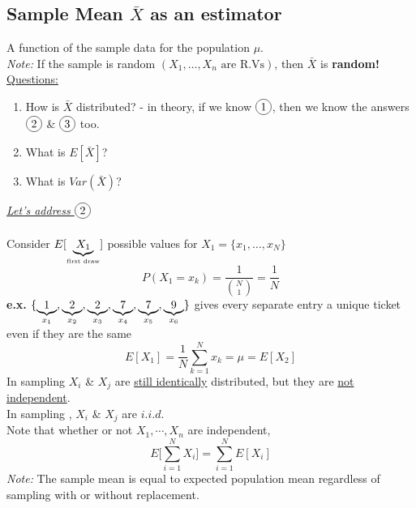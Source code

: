 \subsection*{Sample Mean $\bar{X}$ as an estimator}
A function of the sample data for the population $\mu$.\\
\emph{Note: } If the sample is random $(X_1, \ldots, X_n \text{ are R.Vs})$, then $\bar{X}$ is \textbf{random!}\\
\underline{Questions:} 
\begin{enumerate}[label=\protect\circled{\arabic*}]
	\item How is $\bar{X}$ distributed? - in theory, if we know $\circled{1}$, then we know the answers $\circled{2}$ \& $\circled{3}$ too.
	\item What is $E[\bar{X}]$?
	\item What is $Var(\bar{X})$?
\end{enumerate}
\underline{\textit{Let's address $\circled{2}$}}\\\\
\qquad Consider $E[\underbrace{X_1}_{\text{\tiny first draw}}]$ \qquad \qquad \hspace{5em} possible values for $X_1 = \{x_1, \ldots, x_N\}$
\begin{equation*}
	P(X_1 = x_k) = \frac{1}{\binom{N}{1}} = \frac{1}{N}
\end{equation*}
\textbf{e.x.} $\{\underbrace{1}_{\tiny x_1},\underbrace{2}_{\tiny x_2},\underbrace{2}_{\tiny x_3},\underbrace{7}_{\tiny x_4},\underbrace{7}_{\tiny x_5},\underbrace{9}_{\tiny x_6} \}$ \hspace{2em} {\scriptsize gives every separate entry a unique ticket even if they are the same}
\begin{equation*}
	E[X_1] = \frac{1}{N} \sum\limits_{k=1}^N x_k = \mu = E[X_2] \tag{b/c $X_1$ \& $X_2$ are identically dist.}
\end{equation*}
In sampling  $X_i$ \& $X_j$ are \underline{still identically} distributed, but they are \underline{not independent}.\\
In sampling , $X_i$ \& $X_j$ are $i.i.d.$\\
Note that whether or not $X_1, \cdots, X_n$ are independent, 
\begin{equation*}
	E\bigg[\sum\limits_{i=1}^N X_i\bigg] = \sum\limits_{i=1}^N E[X_i]
\end{equation*}
\emph{Note:} The sample mean is equal to expected population mean regardless of sampling with or without replacement.

